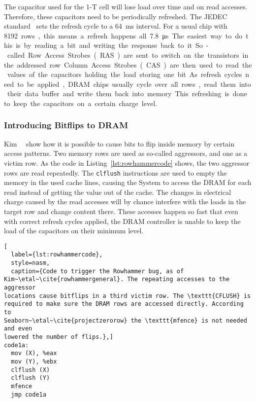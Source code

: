 The capacitor used for the 1-T cell will lose load over time and on read
accesses. Therefore, these capacitors need to be periodically refreshed. The
JEDEC standard~\cite{jedec} sets the refresh cycle to a \SI{64}{\milli\second}
interval. For a usual chip with \SI{8192} rows, this means a refresh happens all
\SI{7.8}{\micro\second}. The easiest way to do this is by reading a bit and
writing the response back to it. So-called Row Access Strobes (RAS) are sent to
switch on the transistors in the addressed row. Column Access Strobes (CAS) are
then used to read the values of the capacitors holding the load storing one bit.
As refresh cycles need to be applied, DRAM chips usually cycle over all rows,
read them into their data buffer and write them back into memory. This
refreshing is done to keep the capacitors on a certain charge level.

\subsubsection{Introducing Bitflips to DRAM}

Kim~\etal~\cite{rowhammergeneral} show how it is possible to cause bits to flip
inside memory by certain access patterns. Two memory rows are used as so-called
aggressors, and one as a victim row. As the code in
Listing~\ref{lst:rowhammercode} shows, the two aggressor rows are read
repeatedly.  The \texttt{clflush} instructions are used to empty the memory in
the used cache lines, causing the System to access the DRAM for each read
instead of getting the value out of the cache. The changes in electrical charge
caused by the read accesses will by chance interfere with the loads in the
target row and change content there. These accesses happen so fast that even
with correct refresh cycles applied, the DRAM controller is unable to keep the
load of the capacitors on their minimum level.

\begin{minipage}{\linewidth}
\begin{lstlisting}[
  label={lst:rowhammercode},
  style=nasm,
  caption={Code to trigger the Rowhammer bug, as of
Kim~\etal~\cite{rowhammergeneral}. The repeating accesses to the aggressor
locations cause bitflips in a third victim row. The \texttt{CFLUSH} is
required to make sure the DRAM rows are accessed directly. According to
Seaborn~\etal~\cite{projectzerorow} the \texttt{mfence} is not needed and even
lowered the number of flips.},]
code1a:
  mov (X), %eax
  mov (Y), %ebx
  clflush (X)
  clflush (Y)
  mfence
  jmp code1a
\end{lstlisting}
\end{minipage}

